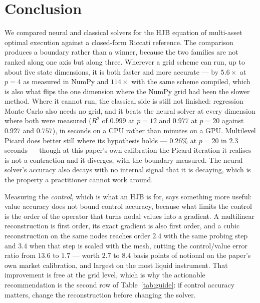 \documentclass[conference]{IEEEtran}
\begin{document}
\section{Conclusion}

We compared neural and classical solvers for the HJB equation of multi-asset optimal execution
against a closed-form Riccati reference. The comparison produces a boundary rather than a winner,
because the two families are not ranked along one axis but along three. Wherever a grid scheme can
run, up to about five state dimensions, it is both faster and more accurate --- by $5.6\times$ at
$p=4$ as measured in NumPy and $114\times$ with the same scheme compiled, which is also what flips
the one dimension where the NumPy grid had been the slower method. Where it cannot run, the classical side is still not finished: regression Monte
Carlo also needs no grid, and it beats the neural solver at every dimension where both were measured
($R^2$ of $0.999$ at $p=12$ and $0.977$ at $p=20$ against $0.927$ and $0.757$), in seconds on a CPU rather than minutes on a GPU. Multilevel Picard does better still where its
hypothesis holds --- $0.26\%$ at $p=20$ in $2.3$ seconds --- though at this paper's own calibration the
Picard iteration it realises is not a contraction and it diverges, with the boundary measured. The
neural solver's accuracy also decays with no internal signal
that it is decaying, which is the property a practitioner cannot work around.

Measuring the \emph{control}, which is what an HJB is for, says something more useful: value
accuracy does not bound control accuracy, because what limits the control is the order of the
operator that turns nodal values into a gradient. A multilinear reconstruction is first order, its
exact gradient is also first order, and a cubic reconstruction on the same nodes reaches order
$2.4$ with the same probing step and $3.4$ when that step is scaled with the mesh, cutting the
control/value error ratio from $13.6$ to $1.7$ --- worth $2.7$ to $8.4$ basis points of notional on
the paper's own market calibration, and largest on the most liquid instrument. That improvement is
free at the grid level, which is
why the actionable recommendation is
the second row of Table~\ref{tab:guide}: if control accuracy matters, change the reconstruction
before changing the solver.
\end{document}
